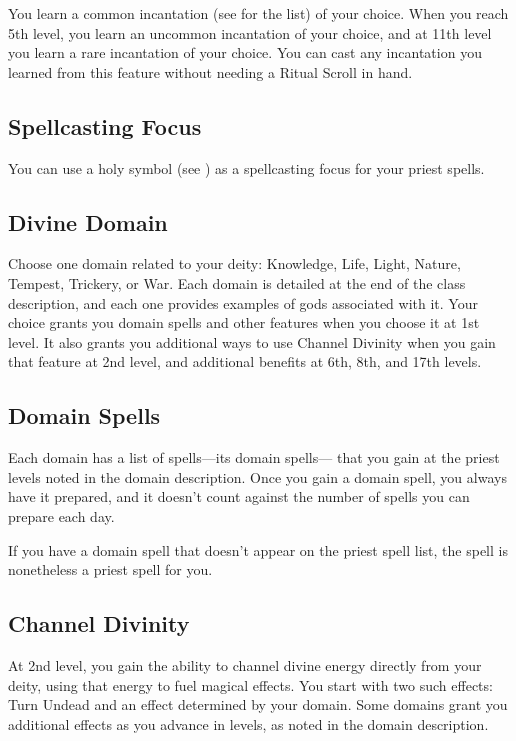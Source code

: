 You learn a common incantation (see  for the list) of your choice. When you reach 5th level, you learn an uncommon incantation of your choice, and at 11th level you learn a rare incantation of your choice. You can cast any incantation you learned from this feature without needing a Ritual Scroll in hand.

\subsection{Spellcasting Focus}

You can use a holy symbol (see ) as a spellcasting focus for your priest spells.

\subsection{Divine Domain}

Choose one domain related to your deity: Knowledge, Life, Light, Nature, Tempest, Trickery, or War. Each domain is detailed at the end of the class description, and each one provides examples of gods associated with it. Your choice grants you domain spells and other features when you choose it at 1st level. It also grants you additional ways to use Channel Divinity when you gain that feature at 2nd level, and additional benefits at 6th, 8th, and 17th levels.

\subsection{Domain Spells}

Each domain has a list of spells—its domain spells— that you gain at the priest levels noted in the domain description. Once you gain a domain spell, you always have it prepared, and it doesn’t count against the number of spells you can prepare each day.

If you have a domain spell that doesn’t appear on the priest spell list, the spell is nonetheless a priest spell for you.

\subsection{Channel Divinity}

At 2nd level, you gain the ability to channel divine energy directly from your deity, using that energy to fuel magical effects. You start with two such effects: Turn Undead and an effect determined by your domain. Some domains grant you additional effects as you advance in levels, as noted in the domain description.

